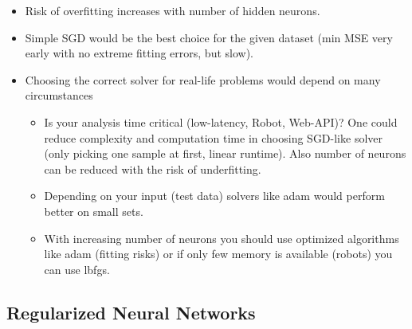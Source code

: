 \documentclass[12pt,a4paper]{article}
\begin{document}
\begin{enumerate}[a)]
\begin{itemize}
  \item Risk of overfitting increases with number of hidden neurons.
  \item Simple SGD would be the best choice for the given dataset (min MSE very
  early with no extreme fitting errors, but slow).
  \item Choosing the correct solver for real-life problems would depend on many
  circumstances
  \begin{itemize}
	  \item Is your analysis time critical (low-latency, Robot, Web-API)? One could
	  reduce complexity and computation time in choosing SGD-like solver (only
	  picking one sample at first, linear runtime). Also number of neurons can be
	  reduced with the risk of underfitting.
	  \item Depending on your input (test data) solvers like adam would perform
	  better on small sets.
	  \item With increasing number of neurons you should use optimized algorithms
	  like adam (fitting risks) or if only few memory is available (robots) you
	  can use lbfgs\autocite{wiki:lbfgs}.
  \end{itemize}
\end{itemize}

\end{enumerate}


\subsection{Regularized Neural Networks}
\end{document}
